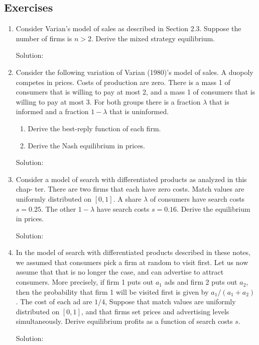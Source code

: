 \documentclass[12pt]{article}
\numberwithin{equation}{section}
\newcommand{\1}[1]{\,\mathbbm{1}_{#1}} %
\begin{document}
\subsection{Exercises}
\begin{enumerate}
	\item Consider Varian's model of sales as described in Section 2.3.
	      Suppose the number of firms is $n>2$. Derive the mixed strategy
	      equilibrium.

	      Solution:
	\item Consider the following variation of Varian (1980)’s model of sales.
	      A duopoly
	      competes in prices. Costs of production are zero. There is a mass 1 of consumers
	      that is willing to pay at most 2, and a mass 1 of consumers that is willing to pay at
	      most 3. For both groups there is a fraction $\lambda$ that is informed and a fraction $1-\lambda$
	      that is uninformed.
	      \begin{enumerate}
		      \item Derive the best-reply function of each firm.
		      \item Derive the Nash equilibrium in prices.
	      \end{enumerate}

	      Solution:
	\item Consider a model of search with differentiated products as analyzed in this chap-
	      ter. There are two firms that each have zero costs. Match values are uniformly
	      distributed on $[0, 1]$. A share $\lambda$ of consumers have search costs $s = 0.25$. The other
	      $1-\lambda$ have search costs $s=0.16$. Derive the equilibrium in prices.

	      Solution:
	\item In the model of search with differentiated products described in these notes, we
	      assumed that consumers pick a firm at random to visit first. Let us now assume that
	      that is no longer the case, and can advertise to attract consumers. More precisely,
	      if firm 1 puts out $a_1$ ads and firm 2 puts out $a_2$, then the probability that firm 1
	      will be visited first is given by $a_1/(a_1 + a_2)$. The cost of each ad are $1/4$,
	      Suppose that match values are uniformly distributed on $[0,1]$, and that firms set
	      prices and advertising levels simultaneously. Derive equilibrium profits as a function
	      of search costs $s$.

	      Solution:
\end{enumerate}
\end{document}
